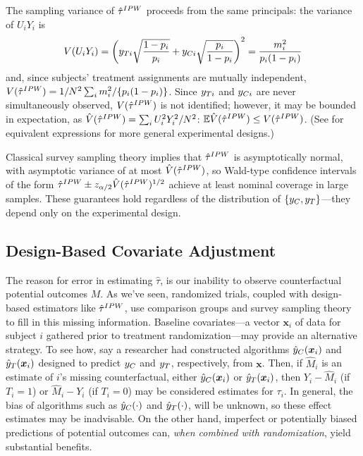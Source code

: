 \sloppy
The sampling variance of $\hat{\tau}^{IPW}$ proceeds from the same principals:
the variance of $U_iY_i$ is
\begin{equation}\label{eq:varTauHat1}
V(U_iY_i)=\left(y_{Ti}\sqrt{\frac{1-p_i}{p_i}}+y_{Ci}\sqrt{\frac{p_i}{1-p_i}}\right)^2=\frac{m_i^2}{p_i(1-p_i)}
\end{equation}
and, since  subjects' treatment assignments are mutually independent,
$V(\hat{\tau}^{IPW})=1/N^2\sum_im_i^2/\{p_i(1-p_i)\}$.
Since $y_{Ti} $ and $y_{Ci} $ are never simultaneously observed,
$V(\hat{\tau}^{IPW})$ is not identified; however, it may be bounded in expectation,
as $\hat{V}(\hat{\tau}^{IPW})=\sum_iU_i^2Y_i^2/N^2$:
$\mathbb{E}\hat{V}(\hat{\tau}^{IPW})\le V(\hat{\tau}^{IPW})$.
(See \citealt{aronowMiddleton} for equivalent expressions for more
general experimental designs.)

Classical survey sampling theory implies that $\hat{\tau}^{IPW}$ is
asymptotically normal, with asymptotic variance of at most
$\hat{V}(\hat{\tau}^{IPW})$, so Wald-type confidence intervals of the form
$\hat{\tau}^{IPW}\pm z_{\alpha/2}\hat{V}(\hat{\tau}^{IPW})^{1/2}$ achieve at least nominal coverage
in large samples.
These guarantees hold regardless of the distribution of
$\{y_C,y_T\}$---they depend only on the experimental design.



\subsection{Design-Based Covariate Adjustment}

The reason for error in estimating $\hat{\tau}$, is our inability to observe counterfactual
potential outcomes $M$.
As we've seen, randomized trials, coupled with design-based estimators
like $\hat{\tau}^{IPW}$, use comparison groups and survey sampling theory to
fill in this missing information.
Baseline covariates---a vector $\bm{x}_i$ of data for subject $i$
gathered prior to treatment randomization---may provide an alternative
strategy.
To see how, say a researcher had constructed algorithms $\hat{y}_C(\bm{x}_i)$ and
$\hat{y}_T(\bm{x}_i)$ designed to predict $y_C$ and $y_T$, respectively, from
$\bm{x}$.
Then, if $\hat{M}_i$ is an estimate of $i$'s missing counterfactual,
either $\hat{y}_C(\bm{x}_i)$ or $\hat{y}_T(\bm{x}_i)$, then $Y_i-\hat{M}_i$ (if $T_i=1$) or $\hat{M}_i-Y_i$ (if $T_i=0$)
may be considered estimates for $\tau_i$.
In general, the bias of algorithms such as $\hat{y}_C(\cdot)$ and
$\hat{y}_T(\cdot)$, will be unknown, so these effect estimates may be inadvisable.
On the other hand, imperfect or potentially biased predictions of
potential outcomes can, \emph{when combined with randomization}, yield
substantial benefits.

